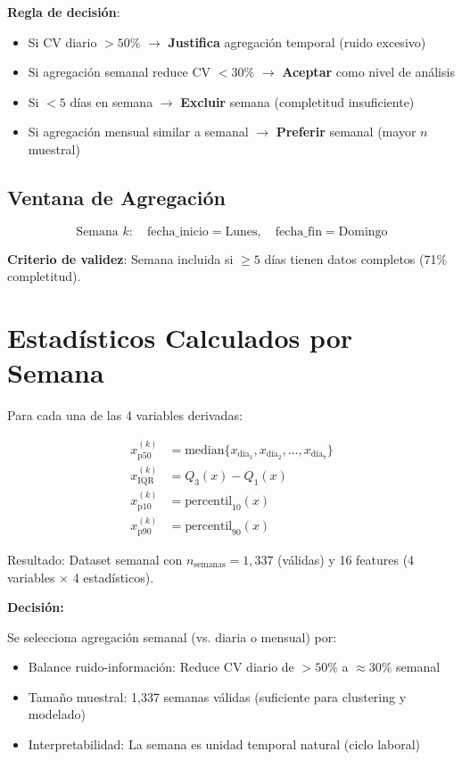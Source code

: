 \documentclass[12pt,letterpaper,twoside]{report}
\begin{document}
\begin{reglabox}
\textbf{Regla de decisión}:

\begin{itemize}[noitemsep]
    \item Si CV diario $> 50\%$ $\to$ \textbf{Justifica} agregación temporal (ruido excesivo)
    \item Si agregación semanal reduce CV $< 30\%$ $\to$ \textbf{Aceptar} como nivel de análisis
    \item Si $< 5$ días en semana $\to$ \textbf{Excluir} semana (completitud insuficiente)
    \item Si agregación mensual similar a semanal $\to$ \textbf{Preferir} semanal (mayor $n$ muestral)
\end{itemize}
\end{reglabox}

\subsection{Ventana de Agregación}

\begin{equation}
\text{Semana } k: \quad \text{fecha\_inicio} = \text{Lunes}, \quad \text{fecha\_fin} = \text{Domingo}
\end{equation}

\textbf{Criterio de validez}: Semana incluida si $\geq 5$ días tienen datos completos (71\% completitud).

\section{Estadísticos Calculados por Semana}

Para cada una de las 4 variables derivadas:

\begin{align}
x^{(k)}_{\text{p50}} &= \text{median}\{x_{\text{día}_1}, x_{\text{día}_2}, \ldots, x_{\text{día}_7}\} \\
x^{(k)}_{\text{IQR}} &= Q_3(x) - Q_1(x) \\
x^{(k)}_{\text{p10}} &= \text{percentil}_{10}(x) \\
x^{(k)}_{\text{p90}} &= \text{percentil}_{90}(x)
\end{align}

Resultado: Dataset semanal con $n_{\text{semanas}}=1,337$ (válidas) y 16 features (4 variables $\times$ 4 estadísticos).

\begin{decisionbox}
\textbf{Decisión:}

Se selecciona agregación semanal (vs. diaria o mensual) por:
\begin{itemize}[noitemsep]
    \item Balance ruido-información: Reduce CV diario de $> 50\%$ a $\approx 30\%$ semanal
    \item Tamaño muestral: 1,337 semanas válidas (suficiente para clustering y modelado)
    \item Interpretabilidad: La semana es unidad temporal natural (ciclo laboral)
\end{itemize}
\end{decisionbox}
\end{document}
